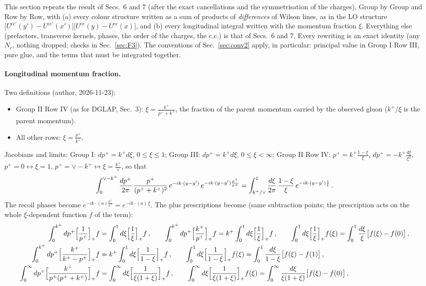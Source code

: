 \noindent This section repeats the result of Secs.~6 and 7 (after the exact cancellations and the symmetrisation of the charges), Group by Group and Row by Row, with (a) every colour structure written as a sum of products of \emph{differences} of Wilson lines, as in the LO structure $\big[U^{ce'}(y')-U^{ce'}(x')\big]\big[U^{ce}(y)-U^{ce}(x)\big]$, and (b) every longitudinal integral written with the momentum fraction $\xi$. Everything else (prefactors, transverse kernels, phases, the order of the charges, the c.c.) is that of Secs.~6 and 7. Every rewriting is an exact identity (any $N_{c}$, nothing dropped; checks in Sec.~\ref{sec:F3}). The conventions of Sec.~\ref{sec:conv2} apply, in particular: principal value in Group I Row III, pure glue, and the terms that must be integrated together.

\paragraph*{Longitudinal momentum fraction.} Two definitions (author, 2026-11-23):
\begin{itemize}
\item Group II Row IV (as for DGLAP, Sec.~3): $\xi=\frac{k^{+}}{p^{+}+k^{+}}$, the fraction of the parent momentum carried by the observed gluon ($k^{+}/\xi$ is the parent momentum).
\item All other rows: $\xi=\frac{p^{+}}{k^{+}}$.
\end{itemize}
Jacobians and limits: Group I: $dp^{+}=k^{+}d\xi$, $0\le\xi\le1$; Group III: $dp^{+}=k^{+}d\xi$, $0\le\xi<\infty$; Group II Row IV: $p^{+}=k^{+}\frac{1-\xi}{\xi}$, $dp^{+}=-k^{+}\frac{d\xi}{\xi^{2}}$, $p^{+}=0\leftrightarrow\xi=1$, $p^{+}=\vee-k^{+}\leftrightarrow\xi=\frac{k^{+}}{\vee}$, so that
\begin{align}
\int_{0}^{\vee-k^{+}}\frac{dp^{+}}{2\pi}\,\frac{p^{+}}{(p^{+}+k^{+})^{2}}\,e^{-ik\cdot(y-y')}\,e^{-ik\cdot(y-y')\frac{p^{+}}{k^{+}}}=\int_{k^{+}/\vee}^{1}\frac{d\xi}{2\pi}\,\frac{1-\xi}{\xi}\,e^{-ik\cdot(y-y')\frac{1}{\xi}}\,.\notag
\end{align}
The recoil phases become $e^{-ik\cdot(a)\frac{p^{+}}{k^{+}}}=e^{-ik\cdot(a)\,\xi}$. The plus prescriptions become (same subtraction points; the prescription acts on the whole $\xi$-dependent function $f$ of the term):
\begin{align}
\int_{0}^{k^{+}}dp^{+}\Big[\frac{1}{p^{+}}\Big]_{+}f&=\int_{0}^{1}d\xi\Big[\frac{1}{\xi}\Big]_{+}f\,,\qquad \int_{0}^{k^{+}}dp^{+}\Big[\frac{k^{+}}{p^{+}}\Big]_{+}f=k^{+}\int_{0}^{1}d\xi\Big[\frac{1}{\xi}\Big]_{+}f\,,\qquad \int_{0}^{1}d\xi\Big[\frac{1}{\xi}\Big]_{+}f(\xi)=\int_{0}^{1}\frac{d\xi}{\xi}\big[f(\xi)-f(0)\big]\,,\notag\\
\int_{0}^{k^{+}}dp^{+}\Big[\frac{k^{+}}{k^{+}-p^{+}}\Big]_{+}f&=k^{+}\int_{0}^{1}d\xi\Big[\frac{1}{1-\xi}\Big]_{+}f\,,\qquad \int_{0}^{1}d\xi\Big[\frac{1}{1-\xi}\Big]_{+}f(\xi)=\int_{0}^{1}\frac{d\xi}{1-\xi}\big[f(\xi)-f(1)\big]\,,\notag\\
\int_{0}^{\infty}dp^{+}\Big[\frac{k^{+}}{p^{+}(p^{+}+k^{+})}\Big]_{+}f&=\int_{0}^{\infty}d\xi\Big[\frac{1}{\xi(1+\xi)}\Big]_{+}f\,,\qquad \int_{0}^{\infty}d\xi\Big[\frac{1}{\xi(1+\xi)}\Big]_{+}f(\xi)=\int_{0}^{\infty}\frac{d\xi}{\xi(1+\xi)}\big[f(\xi)-f(0)\big]\,,\notag
\end{align}

